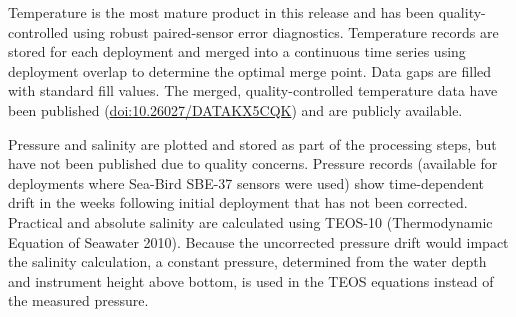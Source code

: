 Temperature is the most mature product in this release and has been quality-controlled using robust paired-sensor error diagnostics. Temperature records are stored for each deployment and merged into a continuous time series using deployment overlap to determine the optimal merge point. Data gaps are filled with standard fill values. The merged, quality-controlled temperature data have been published (\href{https://doi.org/10.26027/DATAKX5CQK}{doi:10.26027/DATAKX5CQK}) and are publicly available.

Pressure and salinity are plotted and stored as part of the processing steps, but have not been published due to quality concerns. Pressure records (available for deployments where Sea-Bird SBE-37 sensors were used) show time-dependent drift in the weeks following initial deployment that has not been corrected. Practical and absolute salinity are calculated using TEOS-10 (Thermodynamic Equation of Seawater 2010). Because the uncorrected pressure drift would impact the salinity calculation, a constant pressure, determined from the water depth and instrument height above bottom, is used in the TEOS equations instead of the measured pressure.
